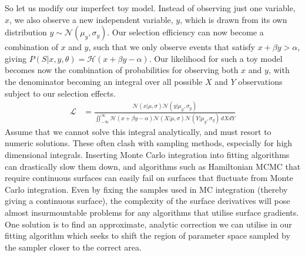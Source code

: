 \documentclass[a4paper,fleqn,usenatbib]{mnras}
\begin{document}
So let us modify our imperfect toy model. Instead of observing just one variable, $x$, we also observe a new independent variable, $y$, which is drawn from its own distribution $y \sim \mathcal{N}(\mu_y, \sigma_y)$. Our selection efficiency can now become a combination of $x$ and $y$, such that we only observe events that satisfy $x + \beta y > \alpha$, giving $P(S|x,y,\theta) = \mathcal{H}(x + \beta y - \alpha)$.  Our likelihood for such a toy model becomes now the combination of probabilities for observing both $x$ and $y$, with the denominator becoming an integral over all possible $X$ and $Y$ observations subject to our selection effects.
\begin{align}
\mathcal{L} &= \frac{ \mathcal{N}(x|\mu, \sigma) \mathcal{N}(y|\mu_y, \sigma_y)}
{\iint_{-\infty}^\infty \mathcal{H}(x + \beta y - \alpha) \mathcal{N}(X|\mu, \sigma) \mathcal{N}(Y|\mu_y, \sigma_y)\, dX dY}
\end{align}
Assume that we cannot solve this integral analytically, and must resort to numeric solutions. These often clash with sampling methods, especially for high dimensional integrals. Inserting Monte Carlo integration into fitting algorithms can drastically slow them down, and algorithms such as Hamiltonian MCMC that require continuous surfaces can easily fail on surfaces that fluctuate from Monte Carlo integration. Even by fixing the samples used in MC integration (thereby giving a continuous surface), the complexity of the surface derivatives will pose almost insurmountable problems for any algorithms that utilise surface gradients. One solution is to find an approximate, analytic correction we can utilise in our fitting algorithm which seeks to shift the region of parameter space sampled by the sampler closer to the correct area.
\end{document}
